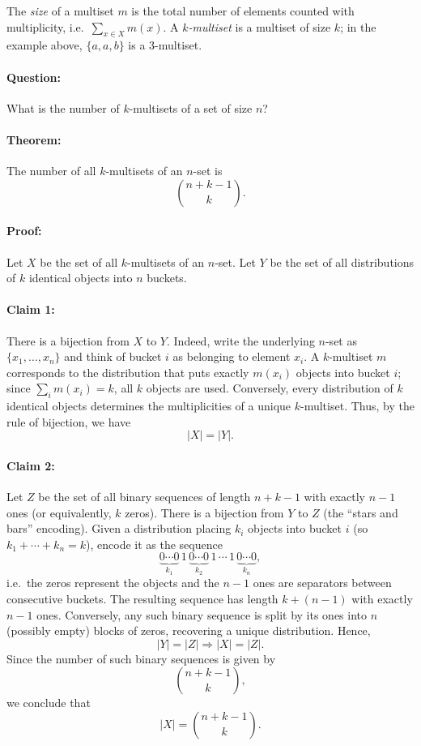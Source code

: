 \documentclass[docmute]{article}
\begin{document}
The \emph{size} of a multiset \( m \) is the total number of elements counted with multiplicity, i.e.\ \( \sum_{x \in X} m(x) \). A \emph{\( k \)-multiset} is a multiset of size \( k \); in the example above, \( \{a,a,b\} \) is a \( 3 \)-multiset.

\paragraph{Question:}
What is the number of \( k \)-multisets of a set of size \( n \)?

\paragraph{Theorem:}  
The number of all \( k \)-multisets of an \( n \)-set is  
\[
\binom{n+k-1}{k}.
\]  

\paragraph{Proof:}  
Let \( X \) be the set of all \( k \)-multisets of an \( n \)-set.  
Let \( Y \) be the set of all distributions of \( k \) identical objects into \( n \) buckets.  

\paragraph{Claim 1:}
There is a bijection from \( X \) to \( Y \).
Indeed, write the underlying \( n \)-set as \( \{x_1, \dots, x_n\} \) and think of bucket \( i \) as belonging to element \( x_i \). A \( k \)-multiset \( m \) corresponds to the distribution that puts exactly \( m(x_i) \) objects into bucket \( i \); since \( \sum_i m(x_i) = k \), all \( k \) objects are used. Conversely, every distribution of \( k \) identical objects determines the multiplicities of a unique \( k \)-multiset. Thus, by the rule of bijection, we have
\[
|X| = |Y|.
\]

\paragraph{Claim 2:}
Let \( Z \) be the set of all binary sequences of length \( n+k-1 \) with exactly \( n-1 \) ones (or equivalently, \( k \) zeros).
There is a bijection from \( Y \) to \( Z \) (the ``stars and bars'' encoding).
Given a distribution placing \( k_i \) objects into bucket \( i \) (so \( k_1 + \cdots + k_n = k \)), encode it as the sequence
\[
\underbrace{0 \cdots 0}_{k_1} \, 1 \, \underbrace{0 \cdots 0}_{k_2} \, 1 \, \cdots \, 1 \, \underbrace{0 \cdots 0}_{k_n},
\]
i.e.\ the zeros represent the objects and the \( n-1 \) ones are separators between consecutive buckets. The resulting sequence has length \( k + (n-1) \) with exactly \( n-1 \) ones. Conversely, any such binary sequence is split by its ones into \( n \) (possibly empty) blocks of zeros, recovering a unique distribution. Hence,
\[
|Y| = |Z| \Rightarrow |X| = |Z|.
\]
Since the number of such binary sequences is given by  
\[
\binom{n+k-1}{k},
\]  
we conclude that  
\[
|X| = \binom{n+k-1}{k}.
\]
\end{document}
